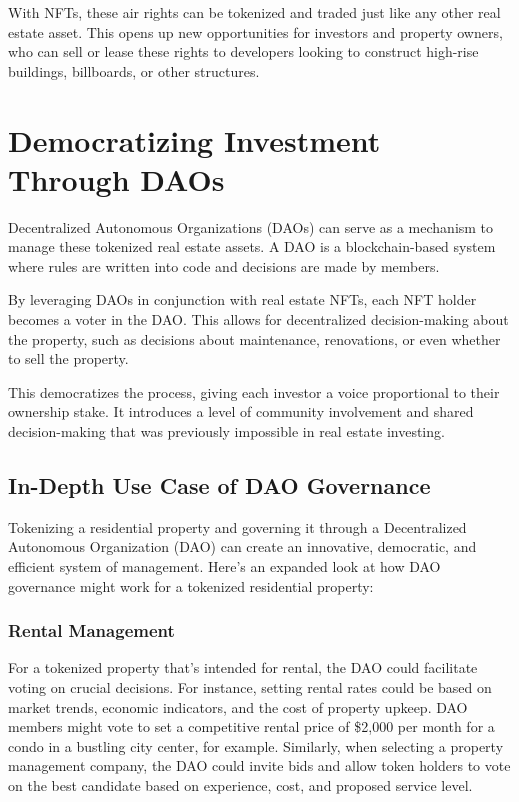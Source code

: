 \documentclass[11pt]{article}
\begin{document}
With NFTs, these air rights can be tokenized and traded just like any other real estate asset. This opens up new opportunities for investors and property owners, who can sell or lease these rights to developers looking to construct high-rise buildings, billboards, or other structures.


\section{Democratizing Investment Through DAOs}

Decentralized Autonomous Organizations (DAOs) can serve as a mechanism to manage these tokenized real estate assets. A DAO is a blockchain-based system where rules are written into code and decisions are made by members.


By leveraging DAOs in conjunction with real estate NFTs, each NFT holder becomes a voter in the DAO. This allows for decentralized decision-making about the property, such as decisions about maintenance, renovations, or even whether to sell the property.


This democratizes the process, giving each investor a voice proportional to their ownership stake. It introduces a level of community involvement and shared decision-making that was previously impossible in real estate investing.


\subsection{In-Depth Use Case of DAO Governance}

Tokenizing a residential property and governing it through a Decentralized Autonomous Organization (DAO) can create an innovative, democratic, and efficient system of management. Here's an expanded look at how DAO governance might work for a tokenized residential property:


\subsubsection{Rental Management}

For a tokenized property that's intended for rental, the DAO could facilitate voting on crucial decisions. For instance, setting rental rates could be based on market trends, economic indicators, and the cost of property upkeep. DAO members might vote to set a competitive rental price of \$2,000 per month for a condo in a bustling city center, for example. Similarly, when selecting a property management company, the DAO could invite bids and allow token holders to vote on the best candidate based on experience, cost, and proposed service level.
\end{document}
